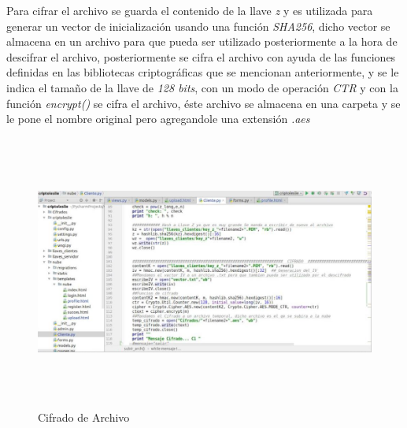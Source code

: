 Para cifrar el archivo se guarda el contenido de la llave \textit{z} y es utilizada para generar un vector de inicialización usando una función \textit{SHA256}, dicho vector se almacena en un archivo para que pueda ser utilizado posteriormente a la hora de descifrar el archivo, posteriormente se cifra el archivo con ayuda de las funciones definidas en las bibliotecas criptográficas que se mencionan anteriormente, y se le indica el tamaño de la llave de \textit{128 bits}, con un modo de operación \textit{CTR} y con la función \textit{encrypt()} se cifra el archivo, éste archivo se almacena en una carpeta y se le pone el nombre original pero agregandole una  extensión \textit{.aes}

			\begin{figure}[H]
			\centering
			\includegraphics[width=17cm, height=9cm]{./images/Interfaz/11.jpg}
			\caption{Cifrado de Archivo}
			\label{fig:6-4-10} 
			\end{figure}



